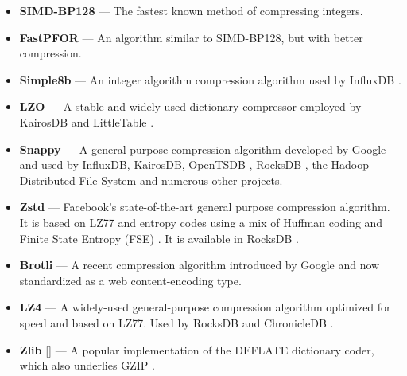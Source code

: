 \begin{itemize}[leftmargin=4mm]
\item \textbf{SIMD-BP128} \cite{fastpfor} --- The fastest known method of compressing integers.
\item \textbf{FastPFOR} \cite{fastpfor} --- An algorithm similar to SIMD-BP128, but with better compression.
\item \textbf{Simple8b} \cite{simple8b} --- An integer algorithm compression algorithm used by InfluxDB \cite{influxDB}.
\item \textbf{LZO} \cite{lzo} --- A stable and widely-used dictionary compressor employed by KairosDB \cite{kairosDB} and LittleTable \cite{littleTable}.
\item \textbf{Snappy} \cite{snappy} --- A general-purpose compression algorithm developed by Google and used by InfluxDB, KairosDB, OpenTSDB \cite{openTSDB}, RocksDB \cite{rocksDB}, the Hadoop Distributed File System \cite{hdfs} and numerous other projects.
\item \textbf{Zstd} \cite{zstd} --- Facebook's state-of-the-art general purpose compression algorithm. It is based on LZ77 and entropy codes using a mix of Huffman coding and Finite State Entropy (FSE) \cite{fse}. It is available in RocksDB \cite{rocksDB}.
\item \textbf{Brotli} \cite{brotli} --- A recent compression algorithm introduced by Google and now standardized as a web content-encoding type.
\item \textbf{LZ4} \cite{lz4} --- A widely-used general-purpose compression algorithm optimized for speed and based on LZ77. Used by RocksDB and ChronicleDB \cite{chronicleDB}.
\item \textbf{Zlib} [] --- A popular implementation of the DEFLATE \cite{deflate} dictionary coder, which also underlies GZIP \cite{gzip}.

\end{itemize}

